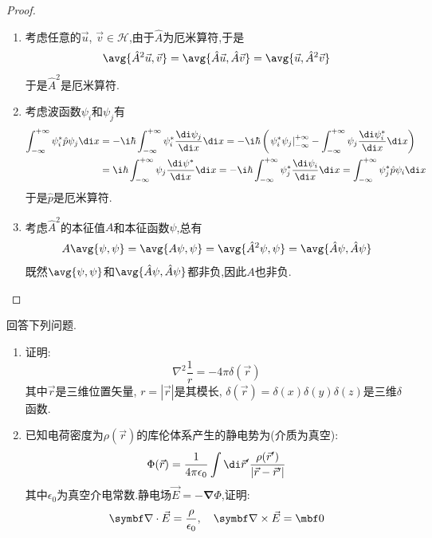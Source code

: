 \documentclass{ctexart}
\begin{document}
\begin{proof}
\begin{enumerate}[label=(\alph*)]
    \item 考虑任意的$\vec{u}$, $\vec{v}\in\mathcal{H}$,由于$\hat{A}$为厄米算符,于是
    \[\avg{\hat{A}^2\vec{u},\vec{v}}=\avg{\hat{A}\vec{u},\hat{A}\vec{v}}=\avg{\vec{u},\hat{A}^2\vec{v}}\]
    于是$\hat{A}^2$是厄米算符.
    \item 考虑波函数$\psi_i$和$\psi_j$有
    \[\begin{aligned}
        \int_{-\infty}^{+\infty}\psi_i^\ast\hat{p}\psi_j\di x
        &=-\i\hbar\int_{-\infty}^{+\infty}\psi_i^\ast\dfrac{\di\psi_j}{\di x}\di x=-\i\hbar\left(\left.\psi_i^\ast\psi_j\right|_{-\infty}^{+\infty}-\int_{-\infty}^{+\infty}\psi_{j}\dfrac{\di\psi_i^\ast}{\di x}\di x\right)\\
        &=\i\hbar\int_{-\infty}^{+\infty}\psi_j\dfrac{\di\psi^\ast}{\di x}\di x=-\i\hbar\int_{-\infty}^{+\infty}\psi_j^\ast\dfrac{\di\psi_i}{\di x}\di x=\int_{-\infty}^{+\infty}\psi_j^\ast\hat{p}\psi_i\di x
    \end{aligned}\]
    于是$\hat{p}$是厄米算符. 
    \item 考虑$\hat{A}^2$的本征值$A$和本征函数$\psi$,总有
    \[A\avg{\psi,\psi}=\avg{A\psi,\psi}=\avg{\hat{A}^2\psi,\psi}=\avg{\hat{A}\psi,\hat{A}\psi}\]
    既然$\avg{\psi,\psi}$和$\avg{\hat{A}\psi,\hat{A}\psi}$都非负,因此$A$也非负.
\end{enumerate}
\end{proof}
\begin{homework}[11.]
    回答下列问题.
    \begin{enumerate}[label=(\alph*)]
        \item 证明:
            \[\nabla^2\dfrac{1}{r}=-4\pi\delta(\vec{r})\]
            其中$\vec{r}$是三维位置矢量, $r=|\vec{r}|$是其模长, $\delta(\vec{r})=\delta(x)\delta(y)\delta(z)$是三维$\delta$函数.
        \item 已知电荷密度为$\rho(\vec{r})$的库伦体系产生的静电势为(介质为真空):
        \[\Phi(\vec{r})=\dfrac{1}{4\pi\epsilon_0}\int\di\vec{r}'\dfrac{\rho(\vec{r}')}{\left|\vec{r}-\vec{r}'\right|}\]
        其中$\epsilon_0$为真空介电常数.静电场$\vec{E}=-\symbf\nabla\Phi$,证明:
        \[\symbf\nabla\cdot\vec{E}=\dfrac{\rho}{\epsilon_0},\quad\symbf\nabla\times\vec{E}=\mbf0\]
    \end{enumerate}
\end{homework}
\end{document}
